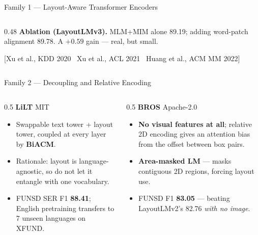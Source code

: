 \documentclass[aspectratio=169, 11pt]{beamer}
\newcommand{\srcnote}[1]{{\scriptsize\color{muted}[#1]}}
\begin{document}
\begin{frame}{Family 1 — Layout-Aware Transformer Encoders}
\begin{columns}[T]
\begin{column}{0.48\textwidth}
{      \textbf{Ablation (LayoutLMv3).} MLM+MIM alone 89.19; adding word-patch alignment 89.78.
      {\color{muted} A $+0.59$ gain — real, but small.}}
      \smallskip

      \srcnote{Xu et al., KDD 2020 \textbullet\ Xu et al., ACL 2021 \textbullet\ Huang et al., ACM MM 2022}
    \end{column}
  \end{columns}
\end{frame}

\begin{frame}{Family 2 — Decoupling and Relative Encoding}
  \begin{columns}[T]
    \begin{column}{0.5\textwidth}
      \textbf{LiLT} \hfill {\footnotesize MIT}
      \begin{itemize}\footnotesize
        \item Swappable text tower + layout tower, coupled at every layer by \textbf{BiACM}.
        \item Rationale: layout is language-agnostic, so do not let it entangle with one vocabulary.
        \item FUNSD SER F1 \textbf{88.41}; English pretraining transfers to 7 unseen languages on XFUND.
      \end{itemize}
    \end{column}
    \begin{column}{0.5\textwidth}
      \textbf{BROS} \hfill {\footnotesize Apache-2.0}
      \begin{itemize}\footnotesize
        \item \textbf{No visual features at all}; relative 2D encoding gives an attention bias from the offset between box pairs.
        \item \textbf{Area-masked LM} — masks contiguous 2D regions, forcing layout use.
        \item FUNSD F1 \textbf{83.05} — beating LayoutLMv2's 82.76 \emph{with no image}.
      \end{itemize}
    \end{column}
  \end{columns}

  \vspace{0.15cm}
  \begin{center}
\end{center}
\end{frame}
\end{document}
